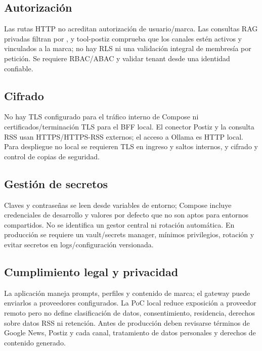 \documentclass[12pt,oneside]{report}
\newcommand{\code}[1]{\texttt{\detokenize{#1}}}
\begin{document}
\subsection{Autorización}
Las rutas HTTP no acreditan autorización de usuario/marca. Las consultas RAG privadas filtran por \code{brand_id}, y tool-postiz comprueba que los canales estén activos y vinculados a la marca; no hay RLS ni una validación integral de membresía por petición. Se requiere RBAC/ABAC y validar tenant desde una identidad confiable.

\subsection{Cifrado}
No hay TLS configurado para el tráfico interno de Compose ni certificados/terminación TLS para el BFF local. El conector Postiz y la consulta RSS usan HTTPS/HTTPS-RSS externos; el acceso a Ollama es HTTP local. Para despliegue no local se requieren TLS en ingreso y saltos internos, y cifrado y control de copias de seguridad.

\subsection{Gestión de secretos}
Claves y contraseñas se leen desde variables de entorno; Compose incluye credenciales de desarrollo y valores por defecto que no son aptos para entornos compartidos. No se identifica un gestor central ni rotación automática. En producción se requiere un vault/secrets manager, mínimos privilegios, rotación y evitar secretos en logs/configuración versionada.

\subsection{Cumplimiento legal y privacidad}
La aplicación maneja prompts, perfiles y contenido de marca; el gateway puede enviarlos a proveedores configurados. La PoC local reduce exposición a proveedor remoto pero no define clasificación de datos, consentimiento, residencia, derechos sobre datos RSS ni retención. Antes de producción deben revisarse términos de Google News, Postiz y cada canal, tratamiento de datos personales y derechos de contenido generado.
\end{document}

